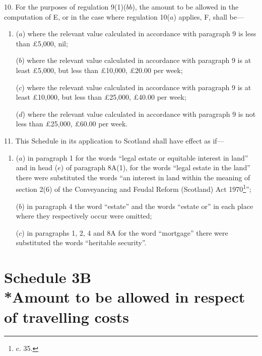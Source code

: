 \documentclass[12pt,a4paper]{article}
\begin{document}
10.  For the purposes of regulation 9(1)($bb$), the amount to be allowed in the computation of E, or in the case where regulation 10($a$) applies, F, shall be—
\begin{enumerate}\item[]
($a$) where the relevant value calculated in accordance with paragraph 9 is less than £5,000, nil;

($b$) where the relevant value calculated in accordance with paragraph 9 is at least £5,000, but less than £10,000, £20.00 per week;

($c$) where the relevant value calculated in accordance with paragraph 9 is at least £10,000, but less than £25,000, £40.00 per week;

($d$) where the relevant value calculated in accordance with paragraph 9 is not less than £25,000, £60.00 per week.
\end{enumerate}

\medskip

11.  This Schedule in its application to Scotland shall have effect as if—
\begin{enumerate}\item[]
($a$) in paragraph 1 for the words “legal estate or equitable interest in land” 
and in head ($e$) of paragraph 8A(1), for the words “legal estate in the land”  %
there were substituted the words “an interest in land within the meaning of section 2(6) of the Conveyancing and Feudal Reform (Scotland) Act 1970\footnote{ c. 35.}”;

($b$) in paragraph 4 the word “estate” and the words “estate or” in each place where they respectively occur were omitted;

($c$) in paragraphs 1, 2, 4 and 8A for the word “mortgage” there were substituted the words “heritable security”.
\end{enumerate}


\part[Schedule 3B --- Amount to be allowed in respect of travelling costs]{Schedule 3B\\*Amount to be allowed in respect of travelling costs}
\end{document}
